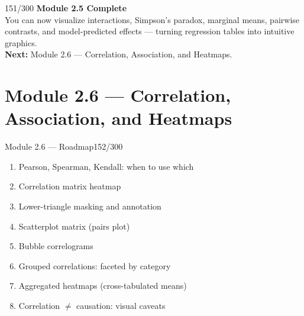 \documentclass[10pt]{beamer}
\newcommand{\smark}[1]{\hfill{\scriptsize\color{codegray}#1}}
\begin{document}
\begin{frame}{}\smark{151/300}
\centering\vspace{1.5cm}
{\Large\textbf{Module 2.5 Complete}}\\[0.5cm]
You can now visualize interactions, Simpson's paradox, marginal means, pairwise contrasts, and model-predicted effects --- turning regression tables into intuitive graphics.\\[0.5cm]
\textbf{Next:} Module 2.6 --- Correlation, Association, and Heatmaps.
\end{frame}

\section{Module 2.6 --- Correlation, Association, and Heatmaps}

\begin{frame}{Module 2.6 --- Roadmap}\smark{152/300}
\begin{enumerate}
    \item Pearson, Spearman, Kendall: when to use which
    \item Correlation matrix heatmap
    \item Lower-triangle masking and annotation
    \item Scatterplot matrix (pairs plot)
    \item Bubble correlograms
    \item Grouped correlations: faceted by category
    \item Aggregated heatmaps (cross-tabulated means)
    \item Correlation $\neq$ causation: visual caveats
\end{enumerate}
\end{frame}
\end{document}
